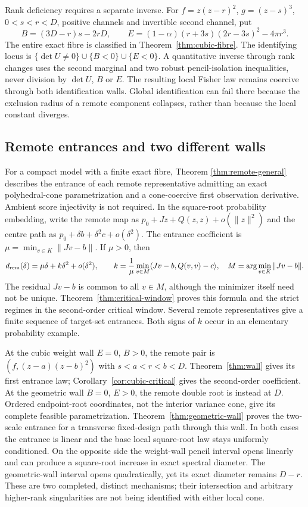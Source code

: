 Rank deficiency requires a separate inverse. For
$f=z(z-r)^2$, $g=(z-s)^3$, $0<s<r<D$, positive channels and invertible
second channel, put
\[
 B=(3D-r)s-2rD,\qquad
 E=(1-\alpha)(r+3s)(2r-3s)^2-4\pi r^3.
\]
The entire exact fibre is classified in Theorem~\ref{thm:cubic-fibre}.
The identifying locus is
$\{\det U\ne0\}\cup\{B<0\}\cup\{E<0\}$.
A quantitative inverse through rank changes uses the second marginal
and two robust pencil-isolation inequalities, never division by
$\det U$, $B$ or $E$. The resulting local Fisher law remains coercive
through both identification walls. Global identification can fail there
because the exclusion radius of a remote component collapses, rather
than because the local constant diverges.

\subsection*{Remote entrances and two different walls}
For a compact model with a finite exact fibre, Theorem
\ref{thm:remote-general} describes the entrance of each remote
representative admitting an exact polyhedral-cone parametrization and a
cone-coercive first observation derivative. Ambient score injectivity is
not required. In the square-root probability embedding, write the remote
map as $p_0+Jz+Q(z,z)+o(\|z\|^2)$ and the centre path as
$p_0+\delta b+\delta^2c+o(\delta^2)$. The entrance coefficient is
$\mu=\min_{v\in K}\|Jv-b\|$. If $\mu>0$, then
\[
 d_{\rm rem}(\delta)=\mu\delta+k\delta^2+o(\delta^2),\qquad
 k=\frac1\mu\min_{v\in M}\langle Jv-b,Q(v,v)-c\rangle,
 \quad M=\arg\min_{v\in K}\|Jv-b\|.
\]
The residual $Jv-b$ is common to all $v\in M$, although the minimizer
itself need not be unique. Theorem~\ref{thm:critical-window} proves this
formula and the strict regimes in the second-order critical window.
Several remote representatives give a finite sequence of target-set
entrances. Both signs of $k$ occur in an elementary probability example.

At the cubic weight wall $E=0$, $B>0$, the remote pair is
$(f,(z-a)(z-b)^2)$ with $s<a<r<b<D$. Theorem~\ref{thm:wall} gives its
first entrance law; Corollary~\ref{cor:cubic-critical} gives the
second-order coefficient. At the geometric wall $B=0$, $E>0$, the
remote double root is instead at $D$. Ordered endpoint-root coordinates,
not the interior variance cone, give its complete feasible
parametrization. Theorem~\ref{thm:geometric-wall} proves the two-scale
entrance for a transverse fixed-design path through this wall. In both
cases the entrance is linear and the base local square-root law stays
uniformly conditioned. On the opposite side the weight-wall pencil
interval opens linearly and can produce a square-root increase in exact
spectral diameter. The geometric-wall interval opens quadratically, yet
its exact diameter remains $D-r$. These are two completed, distinct
mechanisms; their intersection and arbitrary higher-rank singularities
are not being identified with either local cone.

